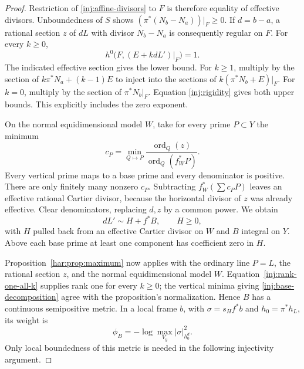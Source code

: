 \begin{proof}
Restriction of \eqref{inj:affine-divisors} to $F$ is therefore equality
of effective divisors.  Unboundedness of $S$ shows
$(\pi^*(N_b-N_a))|_F\ge0$.  If $d=b-a$, a rational section $z$ of
$dL$ with divisor $N_b-N_a$ is consequently regular on $F$.  For every
$k\ge0$,
\begin{equation}\label{inj:rank-one-all-k}
 h^0\bigl(F,(E+kdL')|_F\bigr)=1.
\end{equation}
The indicated effective section gives the lower bound.  For $k\ge1$,
multiply by the section of $k\pi^*N_a+(k-1)E$ to inject into the
sections of $k(\pi^*N_b+E)|_F$.  For $k=0$, multiply by the section
of $\pi^*N_b|_F$.  Equation \eqref{inj:rigidity} gives both upper
bounds.  This explicitly includes the zero exponent.

On the normal equidimensional model $W$, take for every prime $P\subset Y$
the minimum
\[
 c_P=\min_{Q\mapsto P}
       \frac{\operatorname{ord}_Q(z)}{
       \operatorname{ord}_Q(f_W^*P)}.
\]
Every vertical prime maps to a base prime and every denominator is
positive.  There are only finitely many nonzero $c_P$.  Subtracting
$f_W^*(\sum c_PP)$ leaves an effective rational Cartier divisor,
because the horizontal divisor of $z$ was already effective.
Clear denominators, replacing $d,z$ by a common power.  We obtain
\begin{equation}\label{inj:base-decomposition}
 dL'\sim H+f^*B,
 \qquad H\ge0,
\end{equation}
with $H$ pulled back from an effective Cartier divisor on $W$ and
$B$ integral on $Y$.  Above each base prime at least one component
has coefficient zero in $H$.

Proposition~\ref{har:prop:maximum} now applies with the ordinary line $P=L$, the rational section $z$, and the normal equidimensional model $W$. Equation~\eqref{inj:rank-one-all-k} supplies rank one for every $k\ge0$; the vertical minima giving \eqref{inj:base-decomposition} agree with the proposition's normalization. Hence $B$ has a continuous semipositive metric. In a local frame $b$, with $\sigma=s_Hf^*b$ and $h_0=\pi^*h_L$, its weight is
\begin{equation}\label{inj:max-weight}
 \phi_B=-\log\max_{V_y}|\sigma|_{h_0^d}^2.
\end{equation}
Only local boundedness of this metric is needed in the following injectivity argument.


\end{proof}

